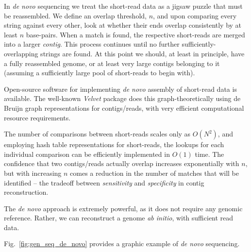 In \textit{de novo} sequencing we treat the short-read data as a jigsaw puzzle that must be reassembled. We define an overlap threshold, $n$, and upon comparing every string against every other, look at whether their ends overlap consistently by at least $n$ base-pairs. When a match is found, the respective short-reads are merged into a larger \textit{contig}. This process continues until no further sufficiently-overlapping strings are found. At this point we should, at least in principle, have a fully reassembled genome, or at least very large contigs belonging to it (assuming a sufficiently large pool of short-reads to begin with).

Open-source software for implementing \textit{de novo} assembly of short-read data is available. The well-known \textit{Velvet} package \cite{velvet} does this graph-theoretically using de Bruijn graph \cite{???} representations for contigs/reads, with very efficient computational resource requirements.

The number of comparisons between short-reads scales only as $O(N^2)$, and employing hash table representations for short-reads, the lookups for each individual comparison can be efficiently implemented in $O(1)$ time. The confidence that two contigs/reads actually overlap increases exponentially with $n$, but with increasing $n$ comes a reduction in the number of matches that will be identified -- the tradeoff between \textit{sensitivity} and \textit{specificity} in contig reconstruction.

The \textit{de novo} approach is extremely powerful, as it does not require any genomic reference. Rather, we can reconstruct a genome \textit{ab initio}, with sufficient read data.

Fig.~\ref{fig:gen_seq_de_novo} provides a graphic example of \textit{de novo} sequencing.

